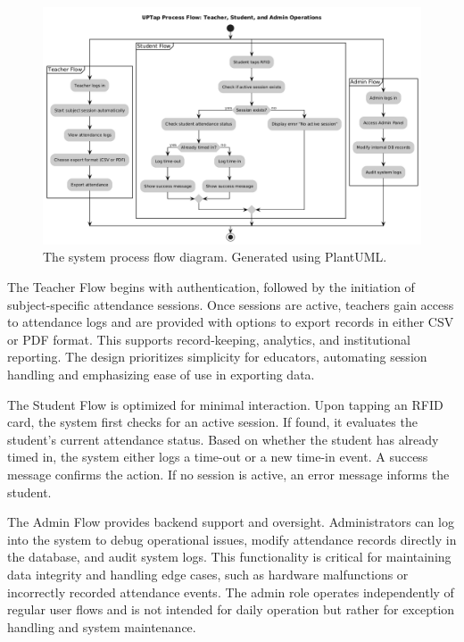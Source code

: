 \begin{figure}[h] %
	\centering
	\includegraphics[width=1\textwidth]{figures/chapter4/flow.png} %
	\caption{The system process flow diagram. Generated using PlantUML.}
	\label{fig:flow}
\end{figure}

The Teacher Flow begins with authentication, followed by the initiation of subject-specific attendance sessions. Once sessions are active, teachers gain access to attendance logs and are provided with options to export records in either CSV or PDF format. This supports record-keeping, analytics, and institutional reporting. The design prioritizes simplicity for educators, automating session handling and emphasizing ease of use in exporting data.

The Student Flow is optimized for minimal interaction. Upon tapping an RFID card, the system first checks for an active session. If found, it evaluates the student's current attendance status. Based on whether the student has already timed in, the system either logs a time-out or a new time-in event. A success message confirms the action. If no session is active, an error message informs the student.

The Admin Flow provides backend support and oversight. Administrators can log into the system to debug operational issues, modify attendance records directly in the database, and audit system logs. This functionality is critical for maintaining data integrity and handling edge cases, such as hardware malfunctions or incorrectly recorded attendance events. The admin role operates independently of regular user flows and is not intended for daily operation but rather for exception handling and system maintenance.

